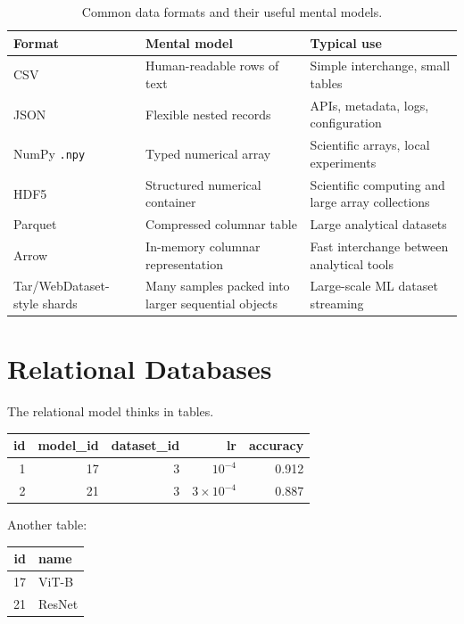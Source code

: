 \begin{table}[htbp]
\centering
\caption{Common data formats and their useful mental models.}
\label{tab:data-formats}
\begin{tabularx}{\linewidth}{@{}lXX@{}}
\toprule
\textbf{Format} & \textbf{Mental model} & \textbf{Typical use} \\
\midrule
CSV & Human-readable rows of text & Simple interchange, small tables \\
JSON & Flexible nested records & APIs, metadata, logs, configuration \\
NumPy \texttt{.npy} & Typed numerical array & Scientific arrays, local experiments \\
HDF5 & Structured numerical container & Scientific computing and large array collections \\
Parquet & Compressed columnar table & Large analytical datasets \\
Arrow & In-memory columnar representation & Fast interchange between analytical tools \\
Tar/WebDataset-style shards & Many samples packed into larger sequential objects & Large-scale ML dataset streaming \\
\bottomrule
\end{tabularx}
\end{table}

\section{Relational Databases}
\label{sec:relational-databases}

The relational model thinks in tables.

\begin{center}
    \begin{tabular}{@{}rrrrr@{}}
    \toprule
    id & model\_id & dataset\_id & lr & accuracy \\
    \midrule
    1 & 17 & 3 & $10^{-4}$ & 0.912 \\
    2 & 21 & 3 & $3\times10^{-4}$ & 0.887 \\
    \bottomrule
    \end{tabular}
\end{center}

Another table:

\begin{center}
    \begin{tabular}{@{}rl@{}}
    \toprule
    id & name \\
    \midrule
    17 & ViT-B \\
    21 & ResNet \\
    \bottomrule
    \end{tabular}
\end{center}

